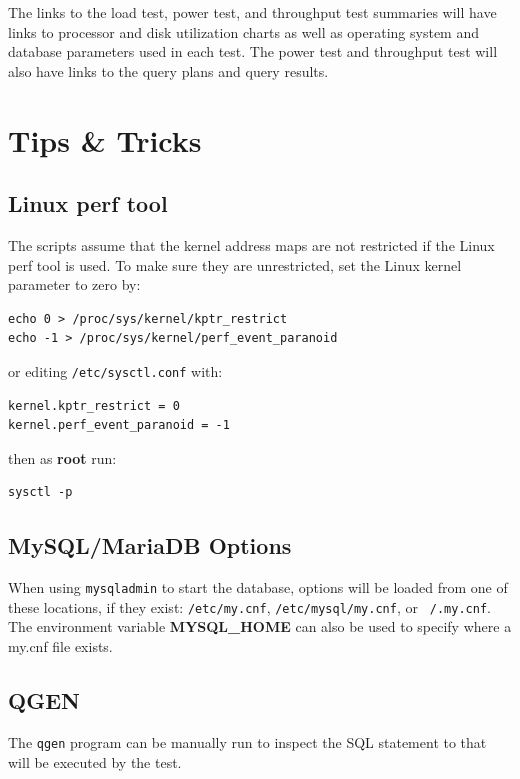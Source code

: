 \documentclass{article}
\begin{document}
The links to the load test, power test, and throughput test summaries will have
links to processor and disk utilization charts as well as operating system and
database parameters used in each test.  The power test and throughput test will
also have links to the query plans and query results.

\section{Tips \& Tricks}

\subsection{Linux perf tool}

The scripts assume that the kernel address maps are not restricted if the Linux
perf tool is used.  To make sure they are unrestricted, set the Linux kernel
parameter to zero by:

\lstset{language=sh}
\begin{lstlisting}
echo 0 > /proc/sys/kernel/kptr_restrict
echo -1 > /proc/sys/kernel/perf_event_paranoid
\end{lstlisting}

or editing \texttt{/etc/sysctl.conf} with:
\lstset{language=sh}
\begin{lstlisting}
kernel.kptr_restrict = 0
kernel.perf_event_paranoid = -1
\end{lstlisting}

then as \textbf{root} run:
\lstset{language=sh}
\begin{lstlisting}
sysctl -p
\end{lstlisting}

\subsection{MySQL/MariaDB Options}

When using \texttt{mysqladmin} to start the database, options will be loaded
from one of these locations, if they exist: \texttt{/etc/my.cnf},
\texttt{/etc/mysql/my.cnf}, or  \texttt{~/.my.cnf}.  The environment variable
\textbf{MYSQL\_HOME} can also be used to specify where a my.cnf file exists.

\subsection{QGEN}

The \texttt{qgen} program can be manually run to inspect the SQL statement to
that will be executed by the test.
\end{document}
